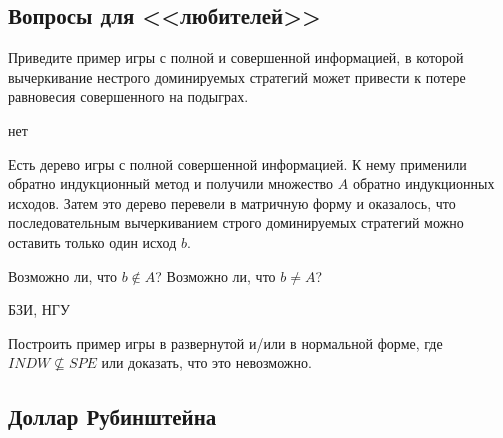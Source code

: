 \subsection{Вопросы для <<любителей>>}


\begin{problem}
Приведите пример  игры с полной и совершенной информацией, в которой вычеркивание нестрого доминируемых стратегий может привести к потере равновесия совершенного на подыграх.
\begin{sol}
нет
\end{sol}
\end{problem}


\begin{problem}
Есть дерево игры с полной совершенной информацией. К нему применили обратно индукционный метод и получили множество  $A$  обратно индукционных исходов. Затем это дерево перевели в матричную форму и оказалось, что последовательным вычеркиванием строго доминируемых стратегий можно оставить только один исход  $b$.\par
Возможно ли, что  $b\notin A$? Возможно ли, что  $b\ne A$?\par



\begin{sol}

\end{sol}
\end{problem}
\begin{problem}
\begin{source}
БЗИ, НГУ
\end{source}
{\rm
Построить пример игры в развернутой и/или в нормальной
форме, где $INDW \not\subseteq SPE$ или доказать, что это
невозможно. }



\begin{sol}

\end{sol}
\end{problem}



\subsection{Доллар Рубинштейна}

